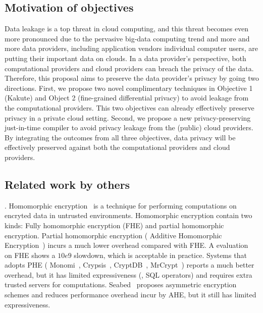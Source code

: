 \vspace{-.15in}\subsection{Motivation of objectives} 
\label{sec:motivation}\vspace{-.075in}

Data leakage is a top threat in cloud computing, and this threat becomes even 
more pronounced due to the pervasive big-data computing trend and more and more 
data providers, including application vendors individual computer users, are 
putting their important data on clouds. In a data provider's perspective, both 
computational providers and cloud providers can breach the privacy of the data. 
Therefore, this proposal aims to preserve the data provider's privacy by going 
two directions. First, we propose two novel complimentary techniques in 
Objective 1 (Kakute) and Object 2 (fine-grained differential privacy) to avoid 
leakage from the computational providers. This two objectives can already 
effectively preserve privacy in a private cloud setting. Second, we propose a 
new privacy-preserving just-in-time compiler to avoid privacy leakage from the 
(public) cloud providers. By integrating the outcomes from all three 
objectives, data privacy will be effectively preserved against both the 
computational providers and cloud providers.


\subsection{Related work by others} 
\label{sec:others-work}\vspace{-.075in}

. Homomorphic 
encryption~\cite{fullmomo:stoc09,paillier,elgamal} is a
technique for performing computations on encryted data in untrusted 
environments. Homomorphic encryption contain two kinds: Fully 
homomorphic encryption (FHE) and partial 
homomorphic encryption.
Partial homomorphic encryption (\eg{} Additive Homomorphic 
Encryption~\cite{paillier})
incurs a much lower overhead compared with FHE. A evaluation~\cite{homo:eval} on
FHE shows a $10e9$ slowdown, which is acceptable in practice.
Systems that adopts PHE (\eg{} Monomi~\cite{monomi:vldb13},
Crypsis~\cite{crypsis:hotcloud14}, CryptDB~\cite{cryptdb:sosp11},
MrCrypt~\cite{mrcrypt:oospsla14})
reports a much better overhead, but it has limited expressiveness
(\eg, SQL operators) and requires extra trusted servers for computations.
Seabed~\cite{seabed:osdi16} proposes asymmetric encryption schemes and reduces 
performance overhead incur by AHE, but it still has limited expressiveness.

